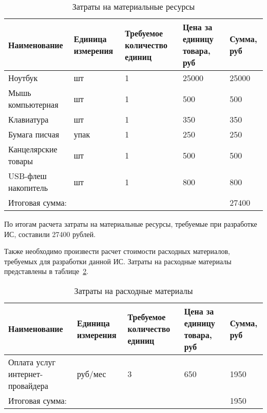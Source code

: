 \begin{footnotesize}
\begin{longtable}[h]{|p{}|p{}|p{}|p{}|p{}|}
	\caption{\label{tab:zatrat}Затраты на материальные ресурсы} \\
	\hline
		\textbf{Наименование} &
		\textbf{Единица измерения} &
		\textbf{Требуемое количество единиц} &
		\textbf{Цена за единицу товара, руб} &
		\textbf{Сумма, руб} \\
	\hline \endhead
		Ноутбук & шт & 1 & 25000 & 25000 \\ \hline
		Мышь компьютерная & шт & 1 & 500 & 500 \\ \hline
		Клавиатура & шт & 1 & 350 & 350 \\ \hline
		Бумага писчая & упак & 1 & 250 & 250 \\ \hline
		Канцелярские товары & шт & 1 & 500 & 500 \\ \hline
		USB-флеш накопитель & шт & 1 & 800 & 800 \\ \hline
		\multicolumn{4}{|l|}{Итоговая сумма:} & 27400 \\ \hline
\end{longtable}
\end{footnotesize}

По итогам расчета затраты на материальные ресурсы, требуемые при разработке ИС, составили 27400 рублей.

Также необходимо произвести расчет стоимости расходных материалов, требуемых для разработки данной ИС. Затраты на расходные материалы представлены в таблице~\ref{tab:zatrat_rash}.

\begin{footnotesize}
\begin{longtable}[h]{|p{}|p{}|p{}|p{}|p{}|}
	\caption{\label{tab:zatrat_rash}Затраты на расходные материалы} \\
	\hline
		\textbf{Наименование} &
		\textbf{Единица измерения} &
		\textbf{Требуемое количество единиц} &
		\textbf{Цена за единицу товара, руб} &
		\textbf{Сумма, руб} \\
	\hline
		Оплата услуг интернет-провайдера & руб/мес & 3 & 650 & 1950 \\ \hline
		\multicolumn{4}{|l|}{Итоговая сумма:} & 1950 \\ \hline
\end{longtable}
\end{footnotesize}

